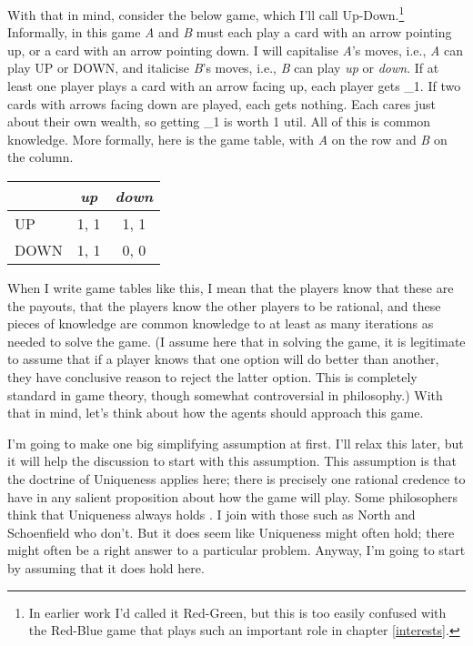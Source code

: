 \documentclass[
  11pt,
]{book}
\begin{document}
With that in mind, consider the below game, which I'll call Up-Down.\footnote{In earlier work I'd called it Red-Green, but this is too easily confused with the Red-Blue game that plays such an important role in chapter \ref{interests}.} Informally, in this game \emph{A} and \emph{B} must each play a card with an arrow pointing up, or a card with an arrow pointing down. I will capitalise \emph{A}'s moves, i.e., \emph{A} can play UP or DOWN, and italicise \emph{B}'s moves, i.e., \emph{B} can play \emph{up} or \emph{down}. If at least one player plays a card with an arrow facing up, each player gets \_1. If two cards with arrows facing down are played, each gets nothing. Each cares just about their own wealth, so getting \_1 is worth 1 util. All of this is common knowledge. More formally, here is the game table, with \emph{A} on the row and \emph{B} on the column.

\begin{longtable}[]{@{}lcc@{}}
\toprule()
& \emph{up} & \emph{down} \\
\midrule()
\endhead
UP & 1, 1 & 1, 1 \\
DOWN & 1, 1 & 0, 0 \\
\bottomrule()
\end{longtable}

When I write game tables like this, I mean that the players know that these are the payouts, that the players know the other players to be rational, and these pieces of knowledge are common knowledge to at least as many iterations as needed to solve the game. (I assume here that in solving the game, it is legitimate to assume that if a player knows that one option will do better than another, they have conclusive reason to reject the latter option. This is completely standard in game theory, though somewhat controversial in philosophy.) With that in mind, let's think about how the agents should approach this game.

I'm going to make one big simplifying assumption at first. I'll relax this later, but it will help the discussion to start with this assumption. This assumption is that the doctrine of Uniqueness applies here; there is precisely one rational credence to have in any salient proposition about how the game will play. Some philosophers think that Uniqueness always holds \citep{White2005-WHIEP}. I join with those such as North \citeyearpar{North2010} and Schoenfield \citeyearpar{Schoenfield2013} who don't. But it does seem like Uniqueness might often hold; there might often be a right answer to a particular problem. Anyway, I'm going to start by assuming that it does hold here.
\end{document}
